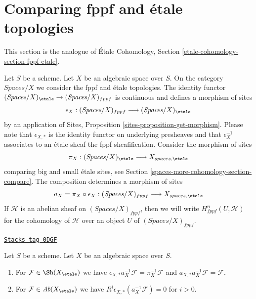 \section{Comparing fppf and \'etale topologies}
\label{spaces-more-cohomology-section-fppf-etale}
This section is the analogue of
\'Etale Cohomology, Section \ref{etale-cohomology-section-fppf-etale}.

\medskip\noindent
Let $S$ be a scheme. Let $X$ be an algebraic space over $S$.
On the category $\textit{Spaces}/X$ we consider the fppf
and \'etale topologies. The identity functor
$(\textit{Spaces}/X)_\etale \to (\textit{Spaces}/X)_{fppf}$
is continuous and defines a morphism of sites
$$
\epsilon_X :
(\textit{Spaces}/X)_{fppf} \longrightarrow (\textit{Spaces}/X)_\etale
$$
by an application of Sites, Proposition \ref{sites-proposition-get-morphism}.
Please note that $\epsilon_{X, *}$ is the identity functor on underlying
presheaves and that $\epsilon_X^{-1}$ associates to an \'etale sheaf the
fppf sheafification.
Consider the morphism of sites
$$
\pi_X : (\textit{Spaces}/X)_\etale \longrightarrow X_{spaces, \etale}
$$
comparing big and small \'etale sites, see Section \ref{spaces-more-cohomology-section-compare}.
The composition determines a morphism of sites
$$
a_X = \pi_X \circ \epsilon_X :
(\textit{Spaces}/X)_{fppf}
\longrightarrow
X_{spaces, \etale}
$$
If $\mathcal{H}$ is an abelian sheaf on $(\textit{Spaces}/X)_{fppf}$,
then we will write $H^n_{fppf}(U, \mathcal{H})$ for the cohomology
of $\mathcal{H}$ over an object $U$ of $(\textit{Spaces}/X)_{fppf}$.

\begin{lemma}
\label{spaces-more-cohomology-lemma-comparison-fppf-etale}
\href{https://stacks.math.columbia.edu/tag/0DGF}{\texttt{Stacks tag 0DGF}}

Let $S$ be a scheme. Let $X$ be an algebraic space over $S$.
\begin{enumerate}
\item For $\mathcal{F} \in \Sh(X_\etale)$ we have
$\epsilon_{X, *}a_X^{-1}\mathcal{F} = \pi_X^{-1}\mathcal{F}$
and $a_{X, *}a_X^{-1}\mathcal{F} = \mathcal{F}$.
\item For $\mathcal{F} \in \textit{Ab}(X_\etale)$ we have
$R^i\epsilon_{X, *}(a_X^{-1}\mathcal{F}) = 0$ for $i > 0$.
\end{enumerate}
\end{lemma}

